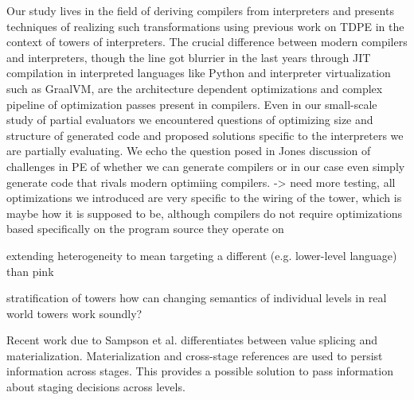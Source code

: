 \documentclass[a4paper,12pt,twoside,openright]{report}
\theoremstyle{definition}
\begin{document}
Our study lives in the field of deriving compilers from interpreters and presents techniques of realizing such transformations using previous work on TDPE in the context of towers of interpreters. The crucial difference between modern compilers and interpreters, though the line got blurrier in the last years through JIT compilation in interpreted languages like Python and interpreter virtualization such as GraalVM, are the architecture dependent optimizations and complex pipeline of optimization passes present in compilers. Even in our small-scale study of partial evaluators we encountered questions of optimizing size and structure of generated code and proposed solutions specific to the interpreters we are partially evaluating. We echo the question posed in Jones \cite{jones1988challenging} discussion of challenges in PE of whether we can generate compilers or in our case even simply generate code that rivals modern optimiing compilers. -> need more testing, all optimizations we introduced are very specific to the wiring of the tower, which is maybe how it is supposed to be, although compilers do not require optimizations based specifically on the program source they operate on

extending heterogeneity to mean targeting a different (e.g. lower-level language) than pink

stratification of towers
how can changing semantics of individual levels in real world towers work soundly?

Recent work due to Sampson et al. \cite{sampson2017static} differentiates between value splicing and materialization. Materialization and cross-stage references are used to persist information across stages. This provides a possible solution to pass information about staging decisions across levels.



\end{document}
